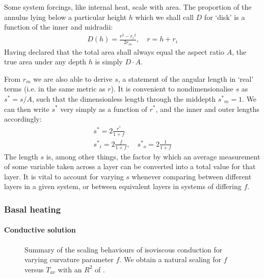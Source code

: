 \documentclass[letterpaper,10pt,english]{jupyterBook}
\begin{document}
\sphinxAtStartPar
Some system forcings, like internal heat, scale with area. The proportion of the annulus lying below a particular height \(h\) \sphinxhyphen{} which we shall call \(D\) for ‘disk’ \sphinxhyphen{} is a function of the inner and mid\sphinxhyphen{}radii:
\begin{equation*}
\begin{split}
D(h) = \frac{r^2 - {r_i}^2}{2 r_m}, \quad r = h + r_i
\end{split}
\end{equation*}
\sphinxAtStartPar
Having declared that the total area shall always equal the aspect ratio \(A\), the true area under any depth \(h\) is simply \(D \cdot A\).

\sphinxAtStartPar
From \(r_m\) we are also able to derive \(s\), a statement of the angular length in ‘real’ terms (i.e. in the same metric as \(r\)). It is convenient to non\sphinxhyphen{}dimensionalise \(s\) as \(s^{*} = s / A\), such that the dimensionless length through the mid\sphinxhyphen{}depth \({s^{*}}_m = 1\). We can then write \(s^{*}\) very simply as a function of \(r^{*}\), and the inner and outer lengths accordingly:
\begin{equation*}
\begin{split}
s^{*} = 2 \frac{r^{*}}{1+f} \\
{s^{*}}_i = 2 \frac{f}{1+f}, \quad {s^{*}}_o = 2 \frac{1}{1+f}
\end{split}
\end{equation*}
\sphinxAtStartPar
The length \(s\) is, among other things, the factor by which an average measurement of some variable taken across a layer can be converted into a total value for that layer. It is vital to account for varying \(s\) whenever comparing between different layers in a given system, or between equivalent layers in systems of differing \(f\).


\subsubsection{Basal heating}
\label{\detokenize{content/chapter_04_isoviscous/background/cylindrical:basal-heating}}

\paragraph{Conductive solution}
\label{\detokenize{content/chapter_04_isoviscous/background/cylindrical:conductive-solution}}
\begin{figure}[htbp]
\centering
\capstart

\noindent{}
\caption{Summary of the scaling behaviours of isoviscous conduction for varying curvature parameter \(f\). We obtain a natural scaling for \(f\) versus \(T_{av}\) with an \(R^2\) of .}\label{\detokenize{content/chapter_04_isoviscous/background/cylindrical:isocondf}}\end{figure}
\end{document}
